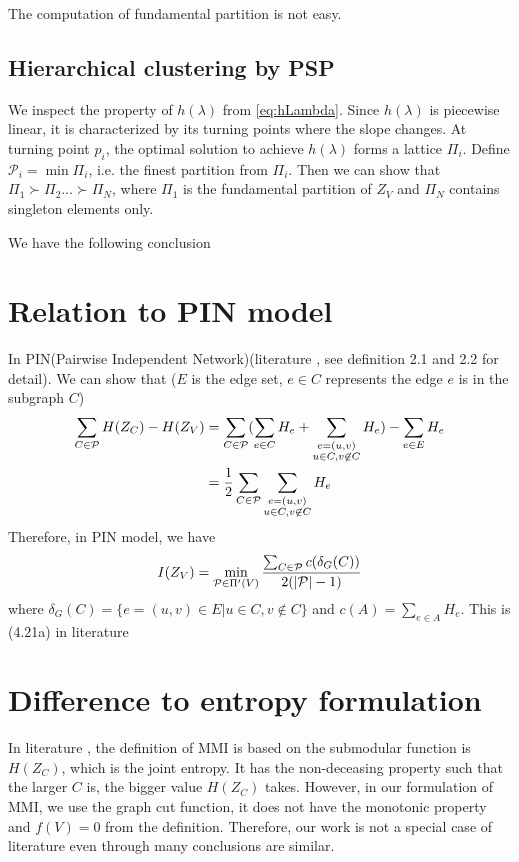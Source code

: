 \documentclass{article}
\begin{document}
The computation of fundamental partition is not easy.
\subsection{Hierarchical clustering by PSP}
We inspect the property of $h(\lambda)$ from \eqref{eq:hLambda}. Since $h(\lambda)$ is piecewise linear, it is characterized by its turning points where the slope changes.
At turning point $p_i$, the optimal solution to achieve $h(\lambda)$ forms a lattice $\Pi_i$.
Define $\mathcal{P}_i = \min \Pi_i$, i.e. the finest partition from $\Pi_i$. Then we can show that
$\Pi_1 \succ \Pi_2 \dots \succ \Pi_N$, where $\Pi_1$ is the fundamental partition of $Z_V$ and $\Pi_N$ contains singleton elements only.

We have the following conclusion
\section{Relation to PIN model}
In PIN(Pairwise Independent Network)(literature \cite{pin}, see definition 2.1 and 2.2 for detail).
We can show that ($E$ is the edge set, $e \in C$ represents the edge $e$ is in the subgraph $C$)
\begin{align*}
\sum_{C \in \P} H(Z_C) - H(Z_V) & = \sum_{C \in \P} (\sum_{e \in C} H_e + \sum_{\substack{e = (u,v) \\ u \in C, v\not\in C }} H_e) - \sum_{e \in E} H_e \\
& = {1 \over 2}\sum_{C \in \P}  \sum_{\substack{e = (u,v) \\ u \in C, v\not\in C }} H_e
\end{align*}
Therefore, in PIN model, we have
\begin{equation}
I(Z_V) = \min_{ \P \in \Pi'(V)} \frac{ \sum_{C \in \P} c(\delta_{G}(C))}{2(\abs{\P} - 1 )}
\end{equation}
where $\delta_{G}(C) = \{e = (u, v) \in E | u \in C, v \not\in C\} $ and $c(A) = \sum_{e\in A} H_e$.
This is (4.21a) in literature \cite{ic}
\section{Difference to entropy formulation}
In literature \cite{ic}, the definition of MMI is based on the submodular function is $H(Z_C)$, which is the joint entropy. It has the non-deceasing property such that the larger $C$ is, the bigger value $H(Z_C)$ takes. However, in our formulation of MMI, we use the graph cut function, it does not have the monotonic property and $f(V) = 0$ from the definition. Therefore, our work is not a special case of literature \cite{ic} even through many conclusions are similar.
\end{document}
